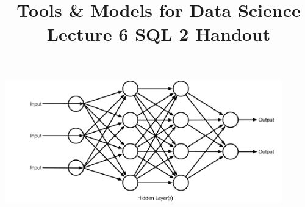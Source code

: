 \documentclass{article}
\title{Tools \& Models for Data Science \\ Lecture 6 SQL 2 Handout}
\date{}
\begin{document}
\maketitle
\thispagestyle{fancy}

\includegraphics[width=0.9\textwidth]{lectFF/nn.pdf}
\end{document}
